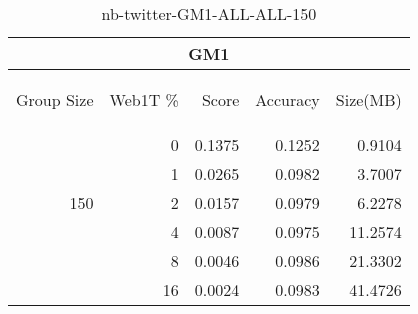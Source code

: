 \begin{center}
\begin{table}[htbp]
\begin{tabular}{ | r | r | r | r | r |}
\hline
\multicolumn{5}{|c|}{GM1}\\
\hline
\begin{sideways}Group Size\end{sideways} & \begin{sideways}Web1T \%\end{sideways} & \begin{sideways}Score\end{sideways} & \begin{sideways}Accuracy\end{sideways} & \begin{sideways}Size(MB)\end{sideways}\\
\hline
\multirow{5}{*}{150}
 & 0 & 0.1375 & 0.1252 & 0.9104\\ \cline{2-5}
 & 1 & 0.0265 & 0.0982 & 3.7007\\ \cline{2-5}
 & 2 & 0.0157 & 0.0979 & 6.2278\\ \cline{2-5}
 & 4 & 0.0087 & 0.0975 & 11.2574\\ \cline{2-5}
 & 8 & 0.0046 & 0.0986 & 21.3302\\ \cline{2-5}
 & 16 & 0.0024 & 0.0983 & 41.4726\\ \cline{2-5}
\hline
\end{tabular}
\caption{nb-twitter-GM1-ALL-ALL-150}
\label{table:nb-twitter-GM1-ALL-ALL-150}
\end{table}
\end{center}


